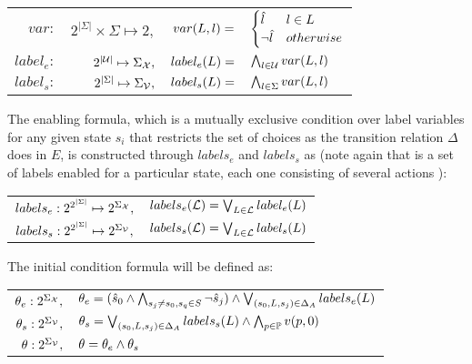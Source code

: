 \begin{center}
	\begin{tabular}{r r r l}
$var:$ & $2^{|\Sigma|}\times \Sigma \mapsto 2,$ &
$
var(\actionLabel, \action) = $&
$\begin{cases}
\varLabel{} & \action \in \actionLabel \\
\neg \varLabel{} & otherwise
\end{cases}

$\\
$label_e:$&$2^{|\nonControlSet|}\mapsto \Sigma_{\gsX},$ &
$label_e(\actionLabel) = $&$\bigwedge_{\action \in \nonControlSet}var(\actionLabel, \action)$\\
$label_s:$&$2^{|\Sigma|}\mapsto \Sigma_{\gsV},$ &
$label_s(\actionLabel) = $&$\bigwedge_{\action \in \Sigma}var(\actionLabel, \action)$\\
\end{tabular}
\end{center}

The enabling formula, which is a mutually exclusive condition over label variables for any given state $s_i$ that restricts the set of choices as the transition relation $\Delta$ does in $E$, is constructed through $labels_e$ and $labels_s$ as (note again that  is a set of labels \actionLabel enabled for a particular state, each one consisting of several actions \action):

\begin{center}
	\begin{tabular}{r l}
		$labels_e:2^{2^{|\Sigma|}}\mapsto 2^{\Sigma_{{\mathcal{X}}}},$ &
		$labels_e(\mathcal{L}) = \bigvee_{L \in \mathcal{L}}label_e(L)$\\
		$labels_s:2^{2^{|\Sigma|}}\mapsto 2^{\Sigma_{{\mathcal{V}}}},$ &
		$labels_s(\mathcal{L}) = \bigvee_{L \in \mathcal{L}}label_s(L)$\\
	\end{tabular}
\end{center}


The initial condition formula will be defined as:
\begin{center}
	\begin{tabular}{r l}
		${\theta_e}:2^{\Sigma_{{\mathcal{X}}}},$ &
		${\theta_e} = (\hat{s}_{0} \wedge\bigwedge_{s_j \neq s_0, s_q \in S}\neg \hat{s}_{j})  \wedge \bigvee_{(s_0,L,s_j) \in \Delta_A}labels_e(L)$\\
		${\theta_s}:2^{\Sigma_{{\mathcal{V}}}},$ &
		${\theta_s} = \bigvee_{(s_0,L,s_j) \in \Delta_A}labels_s(L) \wedge \bigwedge_{p \in \mathbb{P}}v(p,0)$\\
		$\theta:2^{\Sigma_{{\mathcal{V}}}},$ &
		$\theta = {\theta_e} \wedge {\theta_s}$\\		
	\end{tabular}
\end{center}

